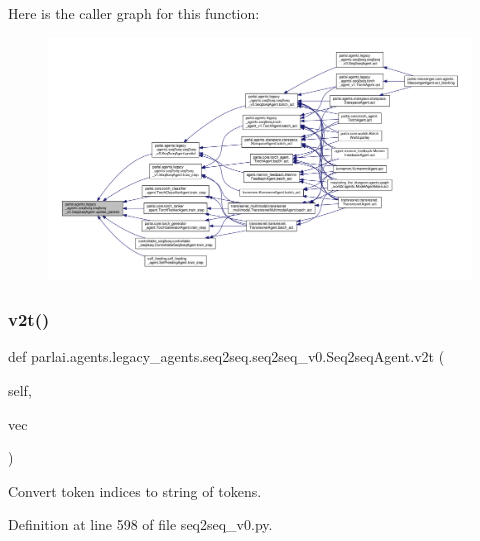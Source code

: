 Here is the caller graph for this function\+:
\nopagebreak
\begin{figure}[H]
\begin{center}
\leavevmode
\includegraphics[width=350pt]{classparlai_1_1agents_1_1legacy__agents_1_1seq2seq_1_1seq2seq__v0_1_1Seq2seqAgent_a3933d4fdc5e603b1a168d92e7da77151_icgraph}
\end{center}
\end{figure}
\mbox{\label{classparlai_1_1agents_1_1legacy__agents_1_1seq2seq_1_1seq2seq__v0_1_1Seq2seqAgent_a8f6de929b475d3915c159c48165b4575}} 
\subsubsection{\texorpdfstring{v2t()}{v2t()}}
{\footnotesize\ttfamily def parlai.\+agents.\+legacy\+\_\+agents.\+seq2seq.\+seq2seq\+\_\+v0.\+Seq2seq\+Agent.\+v2t (\begin{DoxyParamCaption}\item[{}]{self,  }\item[{}]{vec }\end{DoxyParamCaption})}

\begin{DoxyVerb}Convert token indices to string of tokens.\end{DoxyVerb}
 

Definition at line 598 of file seq2seq\+\_\+v0.\+py.



